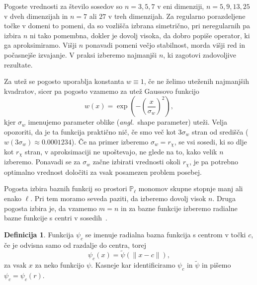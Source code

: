 \documentclass[12pt,a4paper,twoside]{article}
\theoremstyle{definition} %
\newtheorem{definicija}{Definicija}[section]
\theoremstyle{plain} %
\numberwithin{equation}{section}
\newcommand{\ang}[1]{(\hspace{-1.5px}\textit{angl.}\ #1)}
\begin{document}
Pogoste vrednosti za število sosedov so $n = 3, 5, 7$ v eni dimenziji, $n = 5, 9, 13, 25$ v dveh
dimenzijah in $n = 7$ ali $27$ v treh dimenzijah. Za regularno porazdeljene točke v domeni to
pomeni, da so vozlišča izbrana simetrično, pri neregularnih pa izbira $n$ ni tako pomembna, dokler
je dovolj visoka, da dobro popiše operator, ki ga aproksimiramo. Višji $n$ ponavadi pomeni večjo
stabilnost, morda višji red in počasnejše izvajanje. V praksi izberemo najmanjši $n$, ki zagotovi
zadovoljive rezultate.

Za utež se pogosto uporablja konstanta $w\equiv1$, če ne želimo uteženih
najmanjših kvadratov, sicer pa pogosto vzamemo za utež Gaussovo funkcijo
\begin{equation}
   w(x) = \exp\left(-\left(\frac{x}{\sigma_w}\right)^2 \right),
\end{equation}
kjer $\sigma_w$ imenujemo parameter oblike \ang{shape parameter} uteži.
Velja opozoriti, da je ta funkcija praktično nič, če smo več kot $3\sigma_w$
stran od središča ($w(3\sigma_w) \approx 0.0001234$). Če na primer izberemo
$\sigma_w = r_\chi$, se vsi sosedi, ki so dlje kot $r_\chi$ stran, v
aproksimaciji ne upoštevajo, ne glede na to, kako velik $n$ izberemo.
Ponavadi se za $\sigma_w$ začne izbirati vrednosti okoli $r_\chi$, je
pa potrebno optimalno vrednost določiti za vsak posamezen problem posebej.

Pogosta izbira baznih funkcij so prostori $\mathbb{P}_\ell$ monomov skupne
stopnje manj ali enako $\ell$. Pri tem moramo seveda paziti, da izberemo dovolj
visok $n$. Druga pogosta izbira je, da vzamemo $m = n$ in za bazne funkcije
izberemo radialne bazne funkcije s centri v sosedih~\cite{kosec2011h}.

\begin{definicija}
  Funkcija $\psi_c$ se imenuje radialna bazna funkcija s centrom v točki $c$, če je odvisna samo od
  razdalje do centra, torej
  \begin{equation}
    \psi_c(x) = \tilde\psi(\|x - c\|),
  \end{equation}
  za vsak $x$ za neko funkcijo $\psi$. Kasneje kar identificiramo $\psi_c$
  in $\tilde\psi$ in pišemo $\psi_c = \psi_c(r)$.
\end{definicija}
\end{document}
